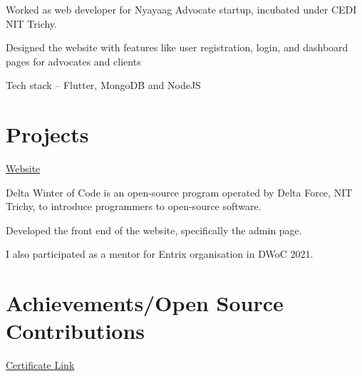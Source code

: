 \documentclass[]{deedy-resume-openfont}
\begin{document}
\begin{minipage}[t]{0.69\textwidth}
\hfill {}
\begin{tightemize}
    \item Worked as web developer for Nyayaag Advocate startup, incubated under CEDI NIT Trichy.
    \item Designed the website with features like user registration, login, and dashboard pages for advocates and clients
	\item Tech stack – Flutter, MongoDB and NodeJS
\end{tightemize}

\sectionsep

\section{Projects}
\raggedright

\hfill \href{http://dwoc.io}{Website}\\
\begin{tightemize}
    \item Delta Winter of Code is an open-source program operated by Delta Force, NIT Trichy, to introduce programmers to open-source software.
    \item Developed the front end of the website, specifically the admin page.
	\item  I also participated as a mentor for Entrix organisation in DWoC 2021.
\end{tightemize}
\sectionsep

\section{Achievements/Open Source Contributions}


\href{https://kossiitkgp.org/public-files/KWoC/2021-Certificates/Student/jaiakash.pdf
}{Certificate Link}


\

\

\

\sectionsep
\end{minipage} 
\end{document}
